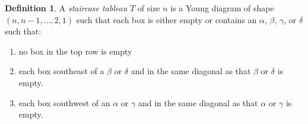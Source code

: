 \documentclass[11pt]{amsart}
\theoremstyle{definition}
\newtheorem{definition}[theorem]{Definition}
\theoremstyle{remark}
\begin{document}
	\begin{definition} A
		\emph{staircase tableau}
	$T$ of size $n$ is a 
Young diagram of shape $(n, n-1, \dots, 2, 1)$ 
such that each box is either empty
or contains an $\alpha$, $\beta$, $\gamma$, or $\delta$ such that:
\begin{enumerate}
	\item no box in the top row is empty
	\item each box southeast of a $\beta$ or $\delta$ and in the same diagonal
 as that $\beta$ or $\delta$ is empty.
 \item each box southwest of an $\alpha$ or $\gamma$ and in the same diagonal
 as that $\alpha$ or $\gamma$ is empty.
\end{enumerate}
\end{definition}
\end{document}
